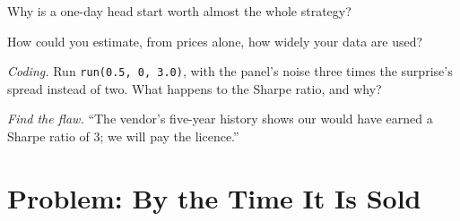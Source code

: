 \begin{exercise}[$\star\star$]\label{exo:s1:alternative-data-strategies:5}
Why is a one-day head start worth almost the whole strategy?
\end{exercise}

\begin{exercise}[$\star\star$]\label{exo:s1:alternative-data-strategies:6}
How could you estimate, from prices alone, how widely your data are used?
\end{exercise}

\begin{exercise}[$\star\star\star$]\label{exo:s1:alternative-data-strategies:7}
\emph{Coding.} Run \texttt{run(0.5, 0, 3.0)}, with the panel's noise three times the surprise's spread instead of two. What happens to the Sharpe ratio, and why?
\end{exercise}

\begin{exercise}[$\star\star\star$]\label{exo:s1:alternative-data-strategies:8}
\emph{Find the flaw.} ``The vendor's five-year history shows our  would have earned a Sharpe ratio of 3; we will pay the licence.''
\end{exercise}

\section{Problem: By the Time It Is Sold}

